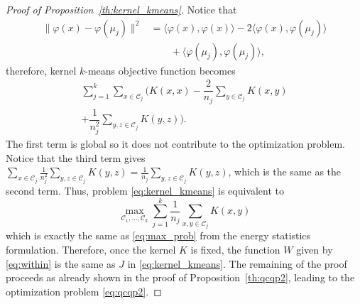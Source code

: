 \documentclass[twoside]{article}
\newcommand\kk{K}
\newcommand\C{{\mathcal{C}}}
\begin{document}
\begin{proof}[Proof of Proposition~\ref{th:kernel_kmeans}]
Notice that 
\begin{equation}
\begin{split}
\| \varphi(x) - \varphi(\mu_j) \|^2 &= \langle 
\varphi(x),  \varphi(x) \rangle
- 2 \langle \varphi(x), \varphi(\mu_j)\rangle \\
& \qquad + \langle \varphi(\mu_j), \varphi(\mu_j) \rangle,
\end{split}
\end{equation}
therefore, kernel $k$-means objective function becomes
\begin{equation}
\label{eq:J}
\begin{split}
\sum_{j=1}^k \sum_{x\in\C_j} \bigg(
\kk(x,x) - 
\dfrac{2}{n_j} \sum_{y\in \C_j} \kk(x,y) \\
+ \dfrac{1}{n_j^2}
\sum_{y,z \in \C_j} \kk(y,z) \bigg).
\end{split}
\end{equation}
The first term is global so it does not contribute to the optimization
problem. Notice that the third term gives
$\sum_{x\in\C_j} \tfrac{1}{n_j^2} \sum_{y,z\in\C_j} \kk(y,z) =
\tfrac{1}{n_j}\sum_{y,z\in\C_j} \kk(y,z)$, which is the same as
the second term. Thus, problem
\eqref{eq:kernel_kmeans} is equivalent to
\begin{equation}
\max_{\C_1,\dotsc,\C_k}
\sum_{j=1}^k \dfrac{1}{n_j} \sum_{x,y \in\C_j} \kk(x,y) 
\end{equation}
which is exactly the same as 
\eqref{eq:max_prob} from the energy statistics formulation. Therefore,
once the kernel $\kk$ is fixed, the function 
$W$ given by \eqref{eq:within} is the same
as $J$ in \eqref{eq:kernel_kmeans}.
The remaining of the proof proceeds as 
already shown in the proof of Proposition~\ref{th:qcqp2}, leading to
the optimization problem \eqref{eq:qcqp2}.
\end{proof}
\end{document}
